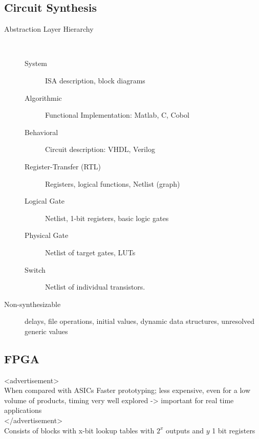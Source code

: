\subsection*{Circuit Synthesis}
\begin{description}
	\item[Abstraction Layer Hierarchy] \ 
	\begin{description}
		\item[System] ISA description, block diagrams
		\item[Algorithmic] Functional Implementation: Matlab, C, Cobol
		\item[Behavioral] Circuit description: VHDL, Verilog
		\item[Register-Transfer (RTL)] Registers, logical functions, Netlist (graph)
		\item[Logical Gate] Netlist, 1-bit registers, basic logic gates
		\item[Physical Gate] Netlist of target gates, \eg LUTs 
		\item[Switch] Netlist of individual transistors.
	\end{description}

	\item[Non-synthesizable] delays, file operations, initial values, dynamic data
	structures, unresolved generic values
\end{description}

\subsection*{FPGA}
<advertisement> \\
When compared with ASICs
Faster prototyping; less expensive, even for a low volume of products, timing
very well explored -> important for real time applications \\
</advertisement>\\
Consists of blocks with x-bit lookup tables with $2^x$ outputs and $y$ 1 bit
registers
